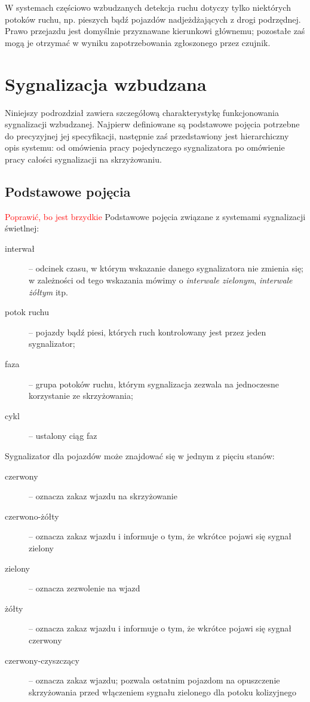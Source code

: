 \documentclass{pracamgr}
\newcommand{\todo}[1]{\textcolor{red}{#1}}
\theoremstyle{plain}
\begin{document}
W systemach częściowo wzbudzanych detekcja ruchu dotyczy tylko
niektórych potoków ruchu, np. pieszych bądź pojazdów nadjeżdżających z
drogi podrzędnej. Prawo przejazdu jest domyślnie przyznawane
kierunkowi głównemu; pozostałe zaś mogą je otrzymać w wyniku
zapotrzebowania zgłoszonego przez czujnik.

\section{Sygnalizacja wzbudzana}
\label{s:sygn-szczegoly}

Niniejszy podrozdział zawiera szczegółową charakterystykę
funkcjonowania sygnalizacji wzbudzanej. Najpierw definiowane są
podstawowe pojęcia potrzebne do precyzyjnej jej specyfikacji,
następnie zaś przedstawiony jest hierarchiczny opis systemu: od
omówienia pracy pojedynczego sygnalizatora po omówienie pracy całości
sygnalizacji na skrzyżowaniu.

\subsection{Podstawowe pojęcia}
\label{ss:pojecia}

\todo{Poprawić, bo jest brzydkie} Podstawowe pojęcia związane z
systemami sygnalizacji świetlnej:
\begin{description}
  \item[interwał] -- odcinek czasu, w którym wskazanie danego
sygnalizatora nie zmienia się; w zależności od tego wskazania mówimy o
\emph{interwale zielonym}, \emph{interwale żółtym} itp.
  \item[potok ruchu] -- pojazdy bądź piesi, których ruch kontrolowany
jest przez jeden sygnalizator;
  \item[faza] -- grupa potoków ruchu, którym sygnalizacja zezwala na
jednoczesne korzystanie ze skrzyżowania;
  \item[cykl] -- ustalony ciąg faz
\end{description}

Sygnalizator dla pojazdów może znajdować się w jednym z pięciu stanów:
\begin{description}
  \item[czerwony] -- oznacza zakaz wjazdu na skrzyżowanie
  \item[czerwono-żółty] -- oznacza zakaz wjazdu i informuje o tym, że
wkrótce pojawi się sygnał zielony
  \item[zielony] -- oznacza zezwolenie na wjazd
  \item[żółty] -- oznacza zakaz wjazdu i informuje o tym, że wkrótce
pojawi się sygnał czerwony
  \item[czerwony-czyszczący] -- oznacza zakaz wjazdu; pozwala ostatnim
pojazdom na opuszczenie skrzyżowania przed włączeniem sygnału
zielonego dla potoku kolizyjnego
\end{description}
\end{document}
